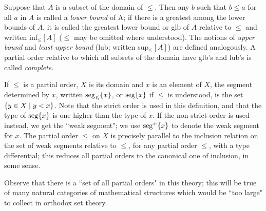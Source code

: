 Suppose that $A$ is a subset of the domain of $\leq$.  Then any
$b$ such that $b \leq a$ for all $a$ in $A$ is called a {\itshape lower
bound\/} of A; if there is a greatest among the lower
bounds of $A$, it is called the greatest lower bound or glb of $A$ relative to $\leq$ and written inf$_{\leq}[A]$
($\leq$ may be omitted where understood).  The notions of {\itshape upper
bound\/}
and {\itshape least upper bound\/} (lub;
written sup$_{\leq}[A]$) are defined analogously.
A partial order relative to which all subsets of the domain have
glb's and lub's is called {\itshape complete\/}.

If $\leq$ is a partial order, $X$ is its domain and $x$ is an
element of $X$, the segment determined by $x$, written
$\mathop{\mathrm{seg}}_{\leqslant}\{x\}$, or $\mathop{\mathrm{seg}}\{x\}$ if $\leq$ is understood, is the set
$\{y \in X \mid y < x\}$.  Note that the strict order is used in this
definition, and that the type of $\mathop{\mathrm{seg}}\{x\}$ is
one higher than the type of $x$.  If the non-strict order is used
instead, we get the ``weak segment"; we use
$\mathop{\mathrm{seg}}^+\{x\}$ to denote the weak segment for $x$.  The partial order $\leq$ on
$X$ is precisely parallel to the inclusion relation on the set
of weak segments relative to $\leq$, for any partial order $\leq$, with a type
differential; this reduces all partial orders to the canonical one of
inclusion, in some sense.

Observe that there is a ``set of all partial orders" in this theory; this will be true of many natural categories of
mathematical structures which would be ``too large" to collect in
orthodox set theory.




\Exercises



